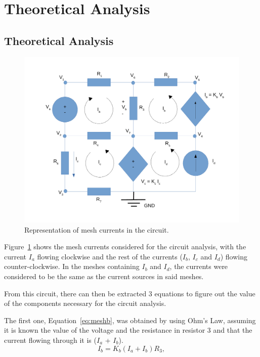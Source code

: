 \newpage
\section{Theoretical Analysis}
\label{sec:analysis}

\subsection{Theoretical Analysis}

\label{sec:Theoretical Analysis}
\begin{figure}[!ht] \centering
\includegraphics[width=0.8\linewidth]{circuit_mesh.pdf}
\caption{Representation of mesh currents in the circuit.}
\label{fig:meshcurrents}
\end{figure}

Figure~\ref{fig:meshcurrents} shows the mesh currents considered for the circuit analysis, with the current $I_a$ flowing clockwise and the rest of the currents ($I_b$, $I_c$ and $I_d$) flowing counter-clockwise. In the meshes containing $I_b$ and $I_d$, the currents were considered to be the same as the current sources in said meshes.

From this circuit, there can then be extracted 3 equations to figure out the value of the components necessary for the circuit analysis.

The first one, Equation~\ref{eq:meshb}, was obtained by using Ohm's Law, assuming it is known the value of the voltage and the resistance in resistor 3 and that the current flowing through it is ($I_a$ + $I_b$).
\begin{equation}
  I_{b} = K_{b}(I_{a} + I_{b})R_{3},
  \label{eq:meshb}
\end{equation}

